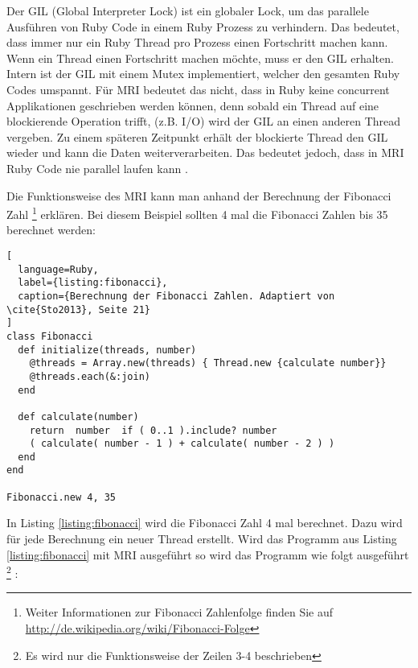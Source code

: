 Der GIL (Global Interpreter Lock) ist ein globaler Lock, um das parallele Ausführen von Ruby Code in einem Ruby Prozess zu verhindern. Das bedeutet, dass immer nur ein Ruby Thread pro Prozess einen Fortschritt machen kann. Wenn ein Thread einen Fortschritt machen möchte, muss er den GIL erhalten. Intern ist der GIL mit einem Mutex implementiert, welcher den gesamten Ruby Codes umspannt. Für MRI bedeutet das nicht, dass in Ruby keine concurrent Applikationen geschrieben werden können, denn sobald ein Thread auf eine blockierende Operation trifft, (z.B. I/O) wird der GIL an einen anderen Thread vergeben. Zu einem späteren Zeitpunkt erhält der blockierte Thread den GIL wieder und kann die Daten weiterverarbeiten. Das bedeutet jedoch, dass in MRI Ruby Code nie parallel laufen kann \cite[p. 42]{Sto2013}. 

Die Funktionsweise des MRI kann man anhand der Berechnung der Fibonacci Zahl \footnote{Weiter Informationen zur Fibonacci Zahlenfolge finden Sie auf \url{http://de.wikipedia.org/wiki/Fibonacci-Folge}} erklären. Bei diesem Beispiel sollten 4 mal die Fibonacci Zahlen bis 35 berechnet werden:

\begin{lstlisting}[
  language=Ruby,
  label={listing:fibonacci},
  caption={Berechnung der Fibonacci Zahlen. Adaptiert von \cite{Sto2013}, Seite 21}
]
class Fibonacci
  def initialize(threads, number)
    @threads = Array.new(threads) { Thread.new {calculate number}}
    @threads.each(&:join)
  end

  def calculate(number)
    return  number  if ( 0..1 ).include? number
    ( calculate( number - 1 ) + calculate( number - 2 ) )
  end
end

Fibonacci.new 4, 35
\end{lstlisting}

In Listing \ref{listing:fibonacci} wird die Fibonacci Zahl 4 mal berechnet. Dazu wird für jede Berechnung ein neuer Thread erstellt. Wird das Programm aus Listing \ref{listing:fibonacci} mit MRI ausgeführt so wird das Programm wie folgt ausgeführt \footnote{Es wird nur die Funktionsweise der Zeilen 3-4 beschrieben} \cite[p. 45-46]{Sto2013}: 

